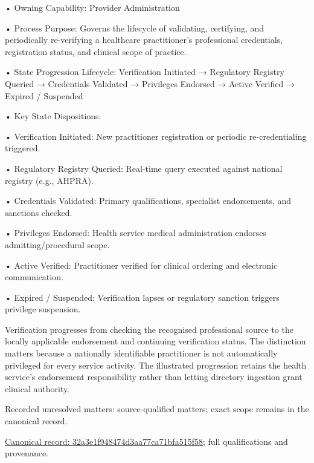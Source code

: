 •
Owning Capability: Provider Administration



•
Process Purpose: Governs the lifecycle of validating, certifying, and periodically re-verifying a healthcare practitioner's professional credentials, registration status, and clinical scope of practice.



•
State Progression Lifecycle: Verification Initiated → Regulatory Registry Queried → Credentials Validated → Privileges Endorsed → Active Verified → Expired / Suspended



•
Key State Dispositions:



•
Verification Initiated: New practitioner registration or periodic re-credentialing triggered.



•
Regulatory Registry Queried: Real-time query executed against national registry (e.g., AHPRA).



•
Credentials Validated: Primary qualifications, specialist endorsements, and sanctions checked.



•
Privileges Endorsed: Health service medical administration endorses admitting/procedural scope.



•
Active Verified: Practitioner verified for clinical ordering and electronic communication.



•
Expired / Suspended: Verification lapses or regulatory sanction triggers privilege suspension.



Verification progresses from checking the recognised professional source to the locally applicable endorsement and continuing verification status. The distinction matters because a nationally identifiable practitioner is not automatically privileged for every service activity. The illustrated progression retains the health service's endorsement responsibility rather than letting directory ingestion grant clinical authority.


{\small Recorded unresolved matters: source-qualified matters; exact scope remains in the canonical record.}\par
{\footnotesize \href{../../../../../../../../continuum/business/business-process/32a3e1f948474d3aa77ca71bfa515f58.md}{Canonical record: 32a3e1f948474d3aa77ca71bfa515f58}; full qualifications and provenance.}\par
